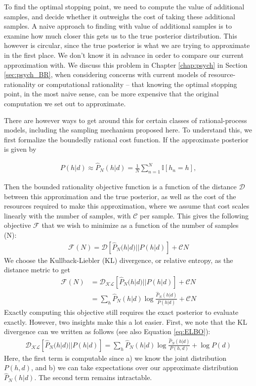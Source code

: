 To find the optimal stopping point, we need to compute the value of additional samples, and decide whether it outweighs the cost of taking these additional samples. A naive approach to finding with value of additional samples is to examine how much closer this gets us to the true posterior distribution. This however is circular, since the true posterior is what we are trying to approximate in the first place. We don't know it in advance in order to compare our current approximation with. We discuss this problem in Chapter \ref{chap:psych} in Section \ref{sec:psych_BR}, when considering concerns with current models of resource-rationality or computational rationality -- that knowing the optimal stopping point, in the most naive sense, can be more expensive that the original computation we set out to approximate. 

There are however ways to get around this for certain classes of rational-process models, including the sampling mechanism proposed here. To understand this, we first formalize the boundedly rational cost function. If the approximate posterior is given by

\begin{align}
P(h|d) \approx \hat{P}_N(h|d) = \frac{1}{N}\sum_{n=1}^N \mathbb{I}[h_n=h],
\end{align}

Then the bounded rationality objective function is a function of the distance $\mathcal{D}$ between this approximation and the true posterior, as well as the cost of the resources required to make this approximation, where we assume that cost scales linearly with the number of samples, with $\mathcal{C}$ per sample. This gives the following objective $\mathcal{F}$ that we wish to minimize as a function of the number of samples (N):
\begin{align}
\mathcal{F}(N) = \mathcal{D}[\hat{P}_N(h|d)||P(h|d)] + \mathcal{C}N
\end{align}
We choose the Kullback-Liebler (KL) divergence, or relative entropy, as the distance metric to get
\begin{align}
\mathcal{F}(N) &= \mathcal{D_{KL}}[\hat{P}_N(h|d)||P(h|d)] + \mathcal{C}N \\
& =  \sum_h \hat{P}_N(h|d) \log \frac{\hat{P}_N(h|d)}{P(h|d)} + \mathcal{C}N
\end{align}
Exactly computing this objective still requires the exact posterior to evaluate exactly. However, two insights make this a lot easier. First, we note that the KL divergence can we written as follows (see also Equation \ref{eq:ELBO}):
\begin{align}
\mathcal{D_{KL}}[\hat{P}_N(h|d)||P(h|d)]  = \sum_h \hat{P}_N(h|d) \log \frac{\hat{P}_N(h|d)}{P(h,d)} + \log P(d)
\label{eq:split_KL}
\end{align}
Here, the first term is computable since a) we know the joint distribution $P(h,d)$,  and b) we can take expectations over our approximate distribution $\hat{P}_N(h|d)$. The second term remains intractable. 

